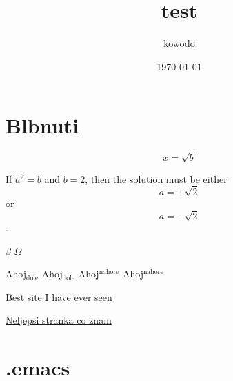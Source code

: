 \documentclass[11pt]{article}
\author{kowodo}
\date{\today}
\title{test}
\begin{document}
\maketitle
\tableofcontents


\section{Blbnuti}
\label{sec-1}
\begin{equation}
x=\sqrt{b}
\end{equation}

If $a^2=b$ and \( b=2 \), then the solution must be
either $$ a=+\sqrt{2} $$ or \[ a=-\sqrt{2} \].

$\beta$ $\Omega$ 

Ahoj$_{\text{dole}}$ Ahoj$_{\text{dole}}$
Ahoj$^{\text{nahore}}$ Ahoj$^{\text{nahore}}$


\href{http://www.randomwebsite.com/}{Best site I have ever seen}

\href{https://www.seznam.cz/}{Neljepsi stranka co znam}

\section{.emacs}
\label{sec-2}
\end{document}
